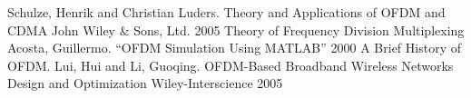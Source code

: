 \documentclass{article} %
\begin{document}
 

% 

\tableofcontents 
\thispagestyle{empty}
\cleardoublepage

 

{\let\oldnumberline\numberline
\renewcommand{\numberline}{Figure~\oldnumberline}
\listoffigures} 
\newpage

{\let\oldnumberline\numberline
\renewcommand{\numberline}{Table~\oldnumberline}
\listoftables}
\newpage

 

 



\newpage

\newpage

\newpage

\newpage

\newpage



% 
% 
\begin{thebibliography}{00}
 Schulze, Henrik and Christian Luders. Theory and Applications of OFDM and CDMA John Wiley \& Sons, Ltd. 2005
 Theory of Frequency Division Multiplexing
 Acosta, Guillermo. “OFDM Simulation Using MATLAB” 2000
 A Brief History of OFDM.
 Lui, Hui and Li, Guoqing. OFDM-Based Broadband Wireless Networks Design and Optimization Wiley-Interscience 2005
\end{thebibliography}

\newpage

\end{document}
